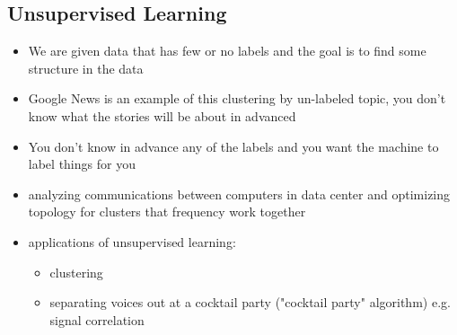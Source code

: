 \documentclass[11pt]{article}
\begin{document}
\subsection{Unsupervised Learning}
\label{sec:orgbcc7906}
\begin{itemize}
\item We are given data that has few or no labels and the goal is to find
some structure in the data

\item Google News is an example of this clustering by un-labeled topic,
you don't know what the stories will be about in advanced

\item You don't know in advance any of the labels and you want the machine to label things for you

\item analyzing communications between computers in data center and
optimizing topology for clusters that frequency work together

\item applications of unsupervised learning:
\begin{itemize}
\item clustering
\item separating voices out at a cocktail party ("cocktail party" algorithm) e.g. signal correlation
\end{itemize}
\end{itemize}
\end{document}
